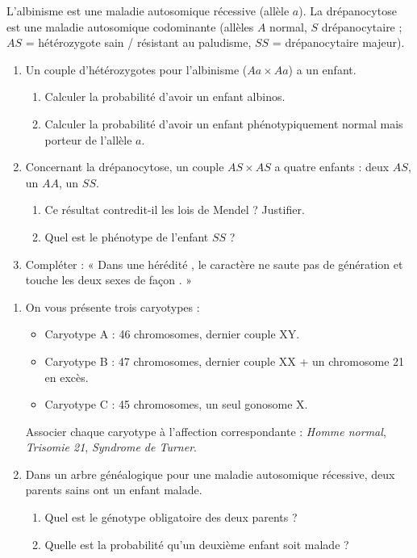 \documentclass[11pt]{article}
\begin{document}
\begin{exercice}
L'albinisme est une maladie autosomique récessive (allèle $a$). La drépanocytose est une maladie autosomique codominante (allèles $A$ normal, $S$ drépanocytaire ; $AS$ = hétérozygote sain / résistant au paludisme, $SS$ = drépanocytaire majeur).
\begin{enumerate}
    \item Un couple d'hétérozygotes pour l'albinisme ($Aa \times Aa$) a un enfant.
    \begin{enumerate}
        \item Calculer la probabilité d'avoir un enfant albinos.
        \item Calculer la probabilité d'avoir un enfant phénotypiquement normal mais porteur de l'allèle $a$.
    \end{enumerate}
    \item Concernant la drépanocytose, un couple $AS \times AS$ a quatre enfants : deux $AS$, un $AA$, un $SS$.
    \begin{enumerate}
        \item Ce résultat contredit-il les lois de Mendel ? Justifier.
        \item Quel est le phénotype de l'enfant $SS$ ?
    \end{enumerate}
    \item Compléter : « Dans une hérédité \underline{\hspace{3cm}}, le caractère ne saute pas de génération et touche les deux sexes de façon \underline{\hspace{3cm}}. »
\end{enumerate}
\end{exercice}

\begin{exercice}
\begin{enumerate}
    \item On vous présente trois caryotypes :
    \begin{itemize}
        \item Caryotype A : 46 chromosomes, dernier couple XY.
        \item Caryotype B : 47 chromosomes, dernier couple XX + un chromosome 21 en excès.
        \item Caryotype C : 45 chromosomes, un seul gonosome X.
    \end{itemize}
    Associer chaque caryotype à l'affection correspondante : \textit{Homme normal}, \textit{Trisomie 21}, \textit{Syndrome de Turner}.
    \item Dans un arbre généalogique pour une maladie autosomique récessive, deux parents sains ont un enfant malade.
    \begin{enumerate}
        \item Quel est le génotype obligatoire des deux parents ?
        \item Quelle est la probabilité qu'un deuxième enfant soit malade ?
    \end{enumerate}
\end{enumerate}
\end{exercice}
\end{document}
